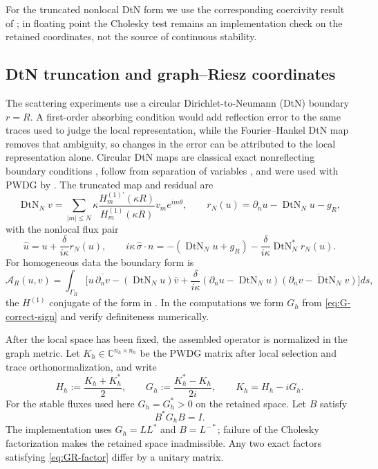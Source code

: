 \documentclass[11pt]{article}
\newcommand{\ii}{i}
\newcommand{\C}{\mathbb{C}}
\newcommand{\DtN}{\operatorname{DtN}}
\numberwithin{equation}{section}
\begin{document}
For the truncated nonlocal DtN form we use the corresponding coercivity result of \citet{KapitaMonk2018}; in floating point the Cholesky test remains an implementation check on the retained coordinates, not the source of continuous stability.

\subsection{DtN truncation and graph--Riesz coordinates}\label{sec:dtn-form}
The scattering experiments use a circular Dirichlet-to-Neumann (DtN) boundary $r=R$.  A first-order absorbing condition would add reflection error to the same traces used to judge the local representation, while the Fourier--Hankel DtN map removes that ambiguity, so changes in the error can be attributed to the local representation alone.  Circular DtN maps are classical exact nonreflecting boundary conditions \citep{KellerGivoli1989}, follow from separation of variables \citep{ColtonKressBook}, and were used with PWDG by \citet{KapitaMonk2018}.  The truncated map and residual are
\begin{equation}\label{eq:dtn-map}
 \DtN_Nv=\sum_{|m|\le N}\kappa\frac{H_m^{(1)\prime}(\kappa R)}{H_m^{(1)}(\kappa R)}v_me^{\ii m\theta},
 \qquad r_N(u)=\partial_nu-\DtN_Nu-g_R,
\end{equation}
with the nonlocal flux pair
\begin{equation}\label{eq:dtn-fluxes}
 \widehat u=u+\frac{\delta}{\ii\kappa}r_N(u),
 \qquad
 \ii\kappa\,\widehat\sigma\cdot n
 =-(\DtN_Nu+g_R)-\frac{\delta}{\ii\kappa}\DtN_N^*r_N(u).
\end{equation}
For homogeneous data the boundary form is
\begin{equation}\label{eq:dtn-form}
\mathscr A_R(u,v)=\int_{\Gamma_R}\Big[
 u\,\overline{\partial_nv}-(\DtN_Nu)\overline v
 +\frac{\delta}{\ii\kappa}(\partial_nu-\DtN_Nu)\overline{(\partial_nv-\DtN_Nv)}\Big]ds,
\end{equation}
the $H^{(1)}$ conjugate of the form in \citet{KapitaMonk2018}.  In the computations we form $G_h$ from \eqref{eq:G-correct-sign} and verify definiteness numerically.

After the local space has been fixed, the assembled operator is normalized in the graph metric.
Let $K_h\in\C^{n_h\times n_h}$ be the PWDG matrix after local selection and trace orthonormalization, and write
\begin{equation}\label{eq:Kh-HG-split}
 H_h:=\frac{K_h+K_h^*}{2},\qquad
 G_h:=\frac{K_h^*-K_h}{2\ii},\qquad
 K_h=H_h-\ii G_h.
\end{equation}
For the stable fluxes used here $G_h=G_h^*>0$ on the retained space.  Let $B$ satisfy
\begin{equation}\label{eq:GR-factor}
 B^*G_hB=I.
\end{equation}
The implementation uses $G_h=LL^*$ and $B=L^{-*}$; failure of the Cholesky factorization makes the retained space inadmissible.  Any two exact factors satisfying \eqref{eq:GR-factor} differ by a unitary matrix.
\end{document}
